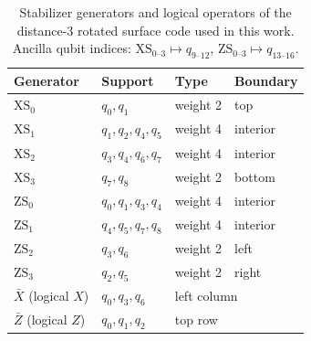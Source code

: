 \documentclass[pdflatex,sn-mathphys,Numbered]{sn-jnl}
\begin{document}
\begin{table}[t]
\centering
\caption{Stabilizer generators and logical operators of the distance-3 rotated surface code used in this work. Ancilla qubit indices: $\mathrm{XS}_{0\text{--}3}\mapsto q_{9\text{--}12}$, $\mathrm{ZS}_{0\text{--}3}\mapsto q_{13\text{--}16}$.}
\label{tab:stabilizers}
\begin{tabular}{@{}llll@{}}
\toprule
Generator & Support & Type & Boundary \\
\midrule
$\mathrm{XS}_0$ & $q_0,q_1$ & weight 2 & top \\
$\mathrm{XS}_1$ & $q_1,q_2,q_4,q_5$ & weight 4 & interior \\
$\mathrm{XS}_2$ & $q_3,q_4,q_6,q_7$ & weight 4 & interior \\
$\mathrm{XS}_3$ & $q_7,q_8$ & weight 2 & bottom \\
$\mathrm{ZS}_0$ & $q_0,q_1,q_3,q_4$ & weight 4 & interior \\
$\mathrm{ZS}_1$ & $q_4,q_5,q_7,q_8$ & weight 4 & interior \\
$\mathrm{ZS}_2$ & $q_3,q_6$ & weight 2 & left \\
$\mathrm{ZS}_3$ & $q_2,q_5$ & weight 2 & right \\
\midrule
$\bar X$ (logical $X$) & $q_0,q_3,q_6$ & \multicolumn{2}{l}{left column} \\
$\bar Z$ (logical $Z$) & $q_0,q_1,q_2$ & \multicolumn{2}{l}{top row} \\
\bottomrule
\end{tabular}
\end{table}
\end{document}
